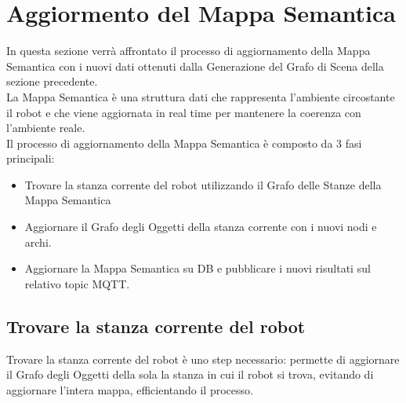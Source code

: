 \section{Aggiormento del Mappa Semantica}
In questa sezione verrà affrontato il processo di aggiornamento della Mappa Semantica con i nuovi dati ottenuti dalla Generazione del Grafo di Scena della sezione precedente.\\
La Mappa Semantica è una struttura dati che rappresenta l'ambiente circostante il robot e che viene aggiornata in real time per mantenere la coerenza con l'ambiente reale.\\
Il processo di aggiornamento della Mappa Semantica è composto da 3 fasi principali:
\begin{itemize}
	\item Trovare la stanza corrente del robot utilizzando il Grafo delle Stanze della Mappa Semantica
	\item Aggiornare il Grafo degli Oggetti della stanza corrente con i nuovi nodi e archi.
	\item Aggiornare la Mappa Semantica su DB e pubblicare i nuovi risultati sul relativo topic MQTT.
\end{itemize}

\subsection{Trovare la stanza corrente del robot}
Trovare la stanza corrente del robot è uno step necessario: permette di aggiornare il Grafo degli Oggetti della sola la stanza in cui il robot si trova, evitando di aggiornare l'intera mappa, efficientando il processo.\\
